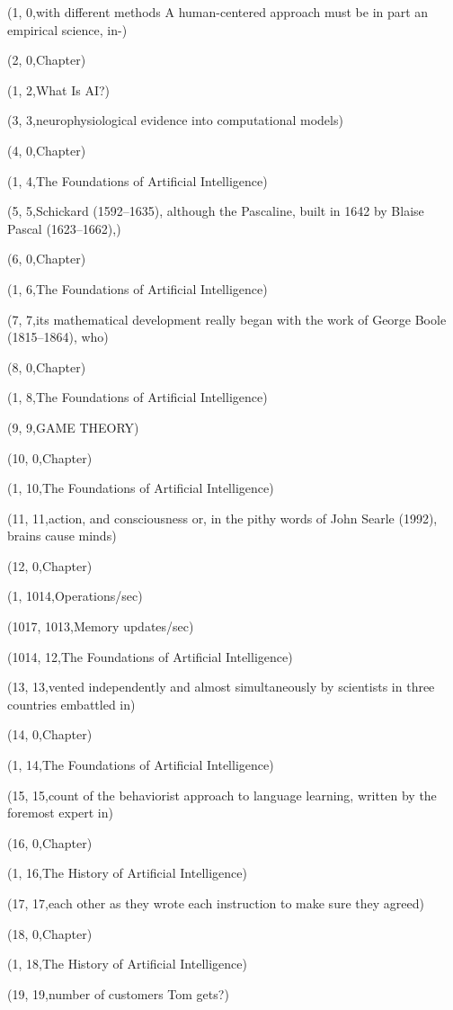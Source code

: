 (1, 0,with different methods A human-centered approach must be in part an empirical science, in-)

(2, 0,Chapter)

(1, 2,What Is AI?)

(3, 3,neurophysiological evidence into computational models)

(4, 0,Chapter)

(1, 4,The Foundations of Artiﬁcial Intelligence)

(5, 5,Schickard (1592–1635), although the Pascaline, built in 1642 by Blaise Pascal (1623–1662),)

(6, 0,Chapter)

(1, 6,The Foundations of Artiﬁcial Intelligence)

(7, 7,its mathematical development really began with the work of George Boole (1815–1864), who)

(8, 0,Chapter)

(1, 8,The Foundations of Artiﬁcial Intelligence)

(9, 9,GAME THEORY)

(10, 0,Chapter)

(1, 10,The Foundations of Artiﬁcial Intelligence)

(11, 11,action, and consciousness or, in the pithy words of John Searle (1992), brains cause minds)

(12, 0,Chapter)

(1, 1014,Operations/sec)

(1017, 1013,Memory updates/sec)

(1014, 12,The Foundations of Artiﬁcial Intelligence)

(13, 13,vented independently and almost simultaneously by scientists in three countries embattled in)

(14, 0,Chapter)

(1, 14,The Foundations of Artiﬁcial Intelligence)

(15, 15,count of the behaviorist approach to language learning, written by the foremost expert in)

(16, 0,Chapter)

(1, 16,The History of Artiﬁcial Intelligence)

(17, 17,each other as they wrote each instruction to make sure they agreed)

(18, 0,Chapter)

(1, 18,The History of Artiﬁcial Intelligence)

(19, 19,number of customers Tom gets?)

